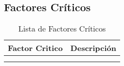 

\newpage
\subsection{Factores Críticos}
\begin{longtable}{p{5cm}|p{11cm}}%
		\hline
			\textbf{Factor Critico} & \textbf{Descripción}\\
		\hline\hline
			{} & {}\\
		\hline\hline
\caption{Lista de Factores Críticos}
\end{longtable}

